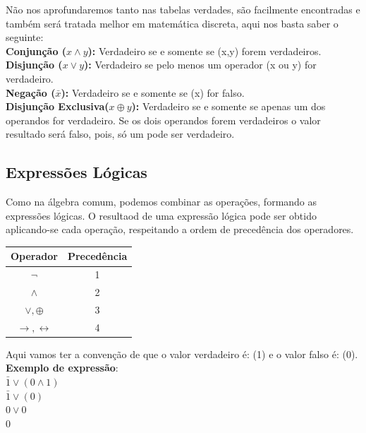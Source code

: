 \documentclass[12pt, onecolumn]{article}
\begin{document}
	Não nos aprofundaremos tanto nas tabelas verdades, são facilmente 
	encontradas e também será tratada melhor em matemática discreta, 
	aqui nos basta saber o seguinte: \\
	\newline
	\textbf{Conjunção ($x \land y$):} Verdadeiro se e somente se (x,y) forem
	verdadeiros. \\
	\newline
	\textbf{Disjunção ($x \lor y$):} Verdadeiro se pelo menos um operador 
	(x ou y) for verdadeiro.\\
	\newline
	\textbf{Negação ($\bar{x}$):} Verdadeiro se e somente se (x) for falso.\\
	\newline
	\textbf{Disjunção Exclusiva($x \oplus y$):} Verdadeiro se e somente se
	apenas um dos operandos for verdadeiro. Se os dois operandos forem 
	verdadeiros o valor resultado será falso, pois, só um pode ser verdadeiro.

	\subsection{\centering Expressões Lógicas}
	
	Como na álgebra comum, podemos combinar as operações, formando as expressões
	lógicas. O resultaod de uma expressão lógica pode ser obtido aplicando-se 
	cada operação, respeitando a ordem de precedência dos operadores. \\
	\newline
	\begin{table}[h]
		\centering
		\begin{tabular}{|c|c|}
			\hline
			Operador & Precedência\\ \hline

			$\lnot$ & 1 \\
			$\land$ & 2 \\
			$\lor, \oplus$ & 3 \\
			$\longrightarrow, \longleftrightarrow$ & 4 \\
			\hline
		\end{tabular}
	\end{table}
	Aqui vamos ter a convenção de que o valor verdadeiro é: (1) e o valor
	falso é: (0).\\
	\newline
	\textbf{Exemplo de expressão}: \\
	$\bar{1} \lor (0 \land 1)$\\
	$ \bar{1} \lor (0)$\\
	$0 \lor 0$\\
	$0$
	
\end{document}
